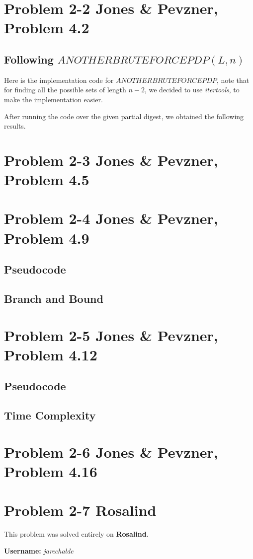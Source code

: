 \documentclass{article}
\begin{document}
\section*{Problem 2-2 Jones \& Pevzner, Problem 4.2}

\subsection*{Following $ANOTHERBRUTEFORCEPDP(L,n)$}

Here is the implementation code for $ANOTHERBRUTEFORCEPDP$, note that for finding all the possible sets of length $n-2$, we decided to use \textit{itertools}, to make the implementation easier.



After running the code over the given partial digest, we obtained the following results.



\section*{Problem 2-3 Jones \& Pevzner, Problem 4.5}

\section*{Problem 2-4 Jones \& Pevzner, Problem 4.9}

\subsection*{Pseudocode}

\subsection*{Branch and Bound}

\section*{Problem 2-5 Jones \& Pevzner, Problem 4.12}

\subsection*{Pseudocode}

\subsection*{Time Complexity}

\section*{Problem 2-6 Jones \& Pevzner, Problem 4.16}

\section*{Problem 2-7 Rosalind}

This problem was solved entirely on \textbf{Rosalind}.

\textbf{Username:} \textit{jarechalde}
\end{document}

